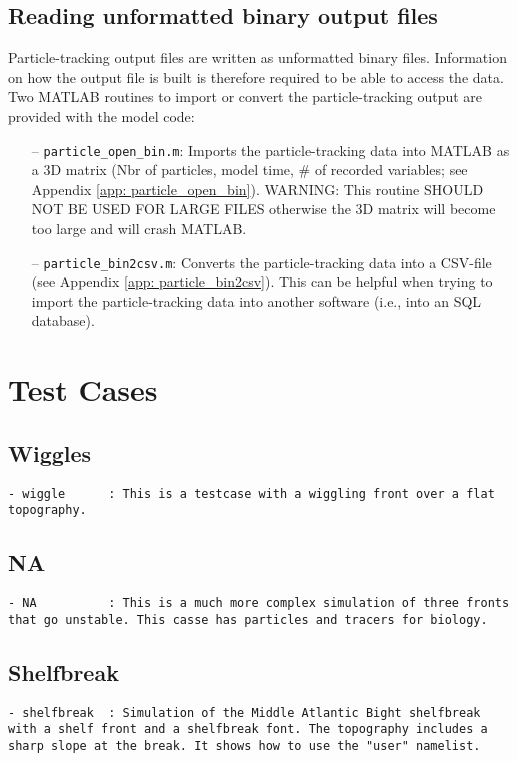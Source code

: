\documentclass[12pt,letterpaper,titlepage]{article}
\begin{document}
\subsection{Reading unformatted binary output files}
Particle-tracking output files are written as unformatted binary files. Information on how the output file is built is therefore required to be able to access the data. Two MATLAB routines to import or convert the particle-tracking output are provided with the model code:
\begin{enumerate}
	\item [--] \texttt{particle\_open\_bin.m}: Imports the particle-tracking data into MATLAB as a 3D matrix (Nbr of particles, model time, \# of recorded variables; see Appendix \ref{app: particle_open_bin}). WARNING: This routine SHOULD NOT BE USED FOR LARGE FILES otherwise the 3D matrix will become too large and will crash MATLAB.
	\item [--] \texttt{particle\_bin2csv.m}: Converts the particle-tracking data into a CSV-file (see Appendix \ref{app: particle_bin2csv}). This can be helpful when trying to import the particle-tracking data into another software (i.e., into an SQL database).
	\end{enumerate}

\section{Test Cases}
\subsection{Wiggles}
\label{sec: Wiggles}
\begin{lstlisting}
- wiggle      : This is a testcase with a wiggling front over a flat topography.  
\end{lstlisting}

\subsection{NA}
\label{sec: NA}
\begin{lstlisting}
- NA          : This is a much more complex simulation of three fronts that go unstable. This casse has particles and tracers for biology.
\end{lstlisting}

\subsection{Shelfbreak}
\label{sec: Shelfbreak}
\begin{lstlisting}
- shelfbreak  : Simulation of the Middle Atlantic Bight shelfbreak with a shelf front and a shelfbreak font. The topography includes a sharp slope at the break. It shows how to use the "user" namelist. 
\end{lstlisting}
\end{document}
